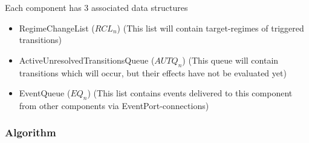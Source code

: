 \documentclass{article}
\begin{document}
\newcommand{\RCLn}{$RCL_n$}
\newcommand{\AUTQn}{$AUTQ_n$}
\newcommand{\EQn}{$EQ_n$}

\noindent Each component has 3 associated data structures
\begin{itemize}
\item RegimeChangeList (\RCLn) (This list will contain target-regimes of
triggered transitions)
\item ActiveUnresolvedTransitionsQueue (\AUTQn) (This queue will
contain transitions which will occur, but their effects have not be
evaluated yet)
\item EventQueue (\EQn) (This list contains events delivered to this
component from other components via EventPort-connections)
\end{itemize}

\subsubsection{Algorithm}
\end{document}
